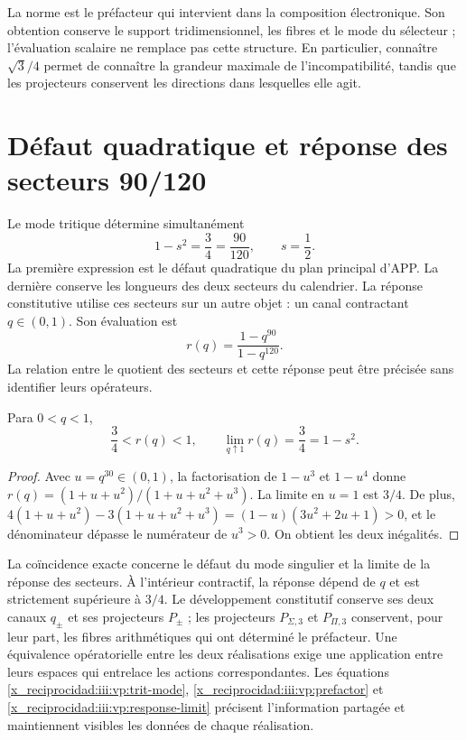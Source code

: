 La norme est le préfacteur qui intervient dans la composition électronique.
Son obtention conserve le support tridimensionnel, les fibres et le mode
du sélecteur ; l’évaluation scalaire ne remplace pas cette structure. En
particulier, connaître $\sqrt3/4$ permet de connaître la grandeur maximale de
l’incompatibilité, tandis que les projecteurs conservent les directions
dans lesquelles elle agit.

\clearpage
\section{Défaut quadratique et réponse des secteurs 90/120}

Le mode tritique détermine simultanément
\begin{equation}
 1-s^2=\frac34=\frac{90}{120},\qquad s=\frac12.
 \label{x_reciprocidad:iii:vp:defect-ratio}
\end{equation}
La première expression est le défaut quadratique du plan principal d'APP. La dernière conserve les longueurs des deux secteurs du calendrier. La réponse constitutive utilise ces secteurs sur un autre objet : un canal contractant $q\in(0,1)$. Son évaluation est
\[
 r(q)=\frac{1-q^{90}}{1-q^{120}}.
\]
La relation entre le quotient des secteurs et cette réponse peut être
précisée sans identifier leurs opérateurs.

\begin{proposition}
Para $0<q<1$,
\begin{equation}
 \frac34<r(q)<1,\qquad
 \lim_{q\uparrow1}r(q)=\frac34=1-s^2.
 \label{x_reciprocidad:iii:vp:response-limit}
\end{equation}
\end{proposition}
\begin{proof}
Avec $u=q^{30}\in(0,1)$, la factorisation de $1-u^3$ et
$1-u^4$ donne
$r(q)=(1+u+u^2)/(1+u+u^2+u^3)$. La limite en $u=1$ est
$3/4$. De plus,
$4(1+u+u^2)-3(1+u+u^2+u^3)
=(1-u)(3u^2+2u+1)>0$, et le dénominateur dépasse le numérateur
de $u^3>0$. On obtient les deux inégalités.
\end{proof}

La coïncidence exacte concerne le défaut du mode singulier et la limite
de la réponse des secteurs. À l’intérieur contractif, la réponse
dépend de $q$ et est strictement supérieure à $3/4$. Le développement
constitutif conserve ses deux canaux $q_\pm$ et ses projecteurs
$P_\pm$ ; les projecteurs $P_{\Sigma,3}$ et $P_{\Pi,3}$ conservent,
pour leur part, les fibres arithmétiques qui ont déterminé le préfacteur.
Une équivalence opératorielle entre les deux réalisations exige une application
entre leurs espaces qui entrelace les actions correspondantes.
Les équations \eqref{x_reciprocidad:iii:vp:trit-mode}, \eqref{x_reciprocidad:iii:vp:prefactor} et
\eqref{x_reciprocidad:iii:vp:response-limit} précisent l’information partagée et
maintiennent visibles les données de chaque réalisation.

